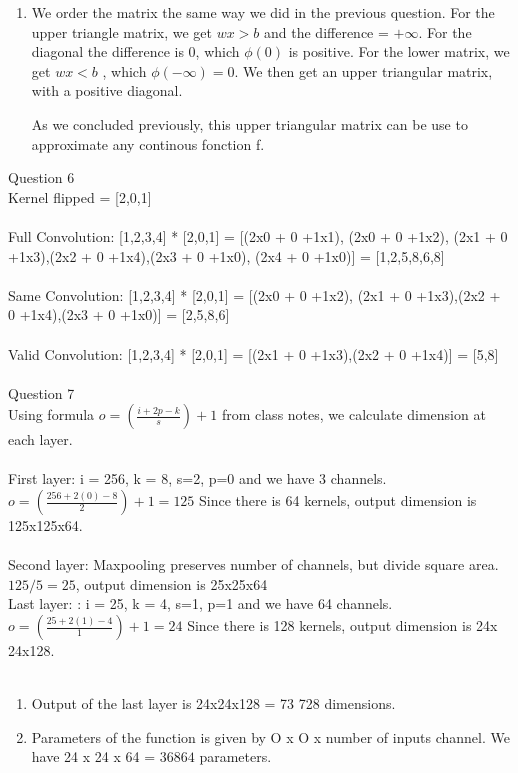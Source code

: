 \documentclass{article}
\begin{document}
\begin{enumerate}
	

	

\item 
	We order the matrix the same way we did in the previous question. For the upper triangle matrix, we get $wx > b$ and the difference = $+\infty$. For the diagonal the 
	difference is 0, which $\phi(0)$ is positive. For the lower matrix, we get  $wx < b$ , which $\phi(-\infty) = 0$. We then get an upper triangular matrix, with a positive
	diagonal. 

	As we concluded previously, this upper triangular matrix can be use to approximate any continous fonction f.


\end{enumerate}
\vspace{1cm}
 Question 6\\

	Kernel flipped = [2,0,1]\\ \\
	Full Convolution:  [1,2,3,4] * [2,0,1] = [(2x0 + 0 +1x1), (2x0 + 0 +1x2), (2x1 + 0 +1x3),(2x2 + 0 +1x4),(2x3 + 0 +1x0), (2x4 + 0 +1x0)] = [1,2,5,8,6,8] \\ \\
	Same Convolution:  [1,2,3,4] * [2,0,1] = [(2x0 + 0 +1x2), (2x1 + 0 +1x3),(2x2 + 0 +1x4),(2x3 + 0 +1x0)] = [2,5,8,6] \\ \\
	Valid Convolution:  [1,2,3,4] * [2,0,1] = [(2x1 + 0 +1x3),(2x2 + 0 +1x4)] = [5,8] \\ \\

\vspace{1cm}
 Question 7\\

    Using formula $ o = (\frac{i + 2p - k}{s}) +1$ from class notes, we calculate dimension at each layer.\\ \\

    First layer: i = 256, k = 8, s=2, p=0 and we have 3 channels. $o =(\frac{256 +2(0) - 8}{2}) + 1 =  125$ Since there is 64 kernels, output dimension is 125x125x64.\\ \\
    Second layer: Maxpooling preserves number of channels, but divide square area. $125/5 = 25$, output dimension is 25x25x64\\
   Last layer: : i = 25, k = 4, s=1, p=1 and we have 64 channels. $o =(\frac{25 +2(1) - 4}{1}) + 1 =  24$ Since there is 128 kernels, output dimension is  24x 24x128.\\ \\
  \begin{enumerate}
	\item
	Output of the last layer is 24x24x128 = 73 728 dimensions.\\

	\item
	Parameters of the function is given by O x O x number of inputs channel. We have 24 x 24 x 64 = $36 864$ parameters.
\end{enumerate}
\end{document}
